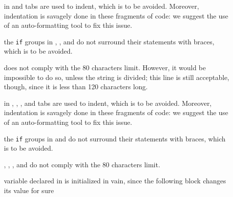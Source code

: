
\begin{description}

	\item [] 
		in  and  tabs are used to indent, which is to be avoided. Moreover, indentation is savagely done in these fragments of code: we suggest the use of an auto-formatting tool to fix this issue.

	\item [] 
		the \verb|if| groups in , , and  do not surround their statements with braces, which is to be avoided. 
		
	\item []
			does not comply with the 80 characters limit. However, it would be impossible to do so, unless the string is divided; this line is still acceptable, though, since it is less than 120 characters long.  

\end{description}


\begin{description}

	\item [] 
		in , , , and   tabs are used to indent, which is to be avoided. Moreover, indentation is savagely done in these fragments of code: we suggest the use of an auto-formatting tool to fix this issue.
		
	\item [] the \verb|if| groups in  and  do not surround their statements with braces, which is to be avoided.
	
	\item [] , 	, , and  do not comply with the 80 characters limit.

	\item [] variable declared in  is initialized in vain, since the following block  changes its value for sure
	



\end{description}


